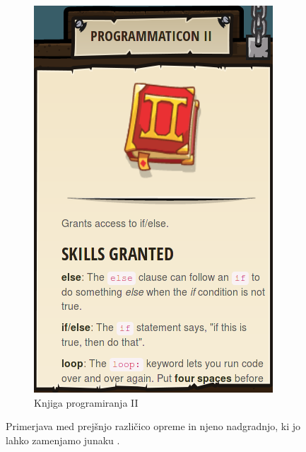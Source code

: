 \begin{figure}[h!]
\begin{subfigure}[]{0.25\textwidth}
        \includegraphics[width=\textwidth]{./images/sc_web/cc_EQ-P2-v01.png}
        \caption{Knjiga programiranja II}
        \label{fig:cc:eq:p2}
    \end{subfigure}
    \caption{Primerjava med prejšnjo različico opreme in njeno
      nadgradnjo, ki jo lahko zamenjamo junaku \cite{web:codecombat}.}
   \label{fig:web:cc:EQ:Primerjava}
\end{figure} 


